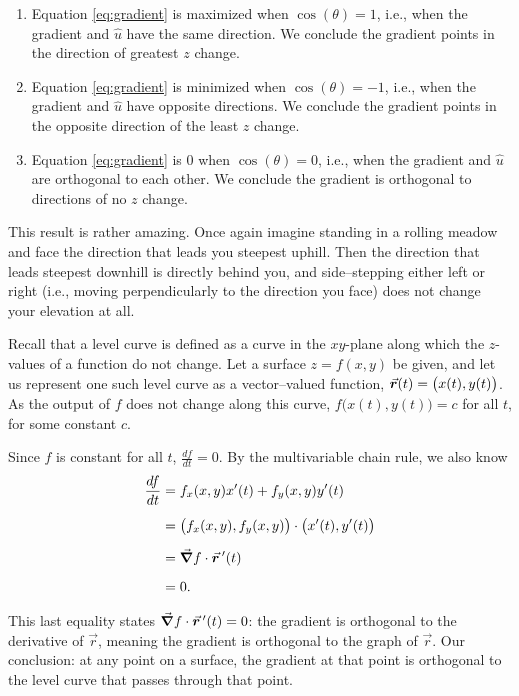 \begin{enumerate}
	\item Equation \eqref{eq:gradient} is maximized when $\cos(\theta) =1$, i.e., when the gradient and $\hat u$ have the same direction. We conclude the gradient points in the direction of greatest $z$ change.
	\item	Equation \eqref{eq:gradient} is minimized when $\cos(\theta) = -1$, i.e., when the gradient and $\hat u$ have opposite directions. We conclude the gradient points in the opposite direction of the least $z$ change.
	\item Equation \eqref{eq:gradient} is 0 when $\cos(\theta) = 0$, i.e., when the gradient and $\hat u$ are orthogonal to each other. We conclude the gradient is orthogonal to directions of no $z$ change. 
\end{enumerate}

This result is rather amazing. Once again imagine standing in a rolling meadow and face the  direction that leads you steepest uphill. Then the direction that leads steepest downhill is directly behind you, and side--stepping either left or right (i.e., moving perpendicularly to the direction you face) does not change your elevation at all.


Recall that a level curve is defined as a curve in the $xy$-plane along which the $z$-values of a function do not change. Let a surface $z=f(x,y)$ be given, and let us represent one such level curve as a vector--valued function, $\vrt = \left( x(t), y(t)\right)$. As the output of $f$ does not change along this curve, $f\big(x(t),y(t)\big) = c$ for all $t$, for some constant $c$.

Since $f$ is constant for all $t$, $\frac{df}{dt} = 0$. By the multivariable chain rule, we also know
\begin{align*}
\frac{df}{dt} &= f_x(x,y)x'(t) + f_y(x,y)y'(t)\\[0.2cm]						
						&= \left( f_x(x,y),f_y(x,y)\right) \cdot \left( x'(t),y'(t)\right)\\[0.2cm]
						&= \vec{\nabla} f \cdot \vrp(t)\\[0.2cm]
						&=0.
\end{align*}

This last equality states $\vec{\nabla} f \cdot \vrp(t) = 0$: the gradient is orthogonal to the derivative of $\vec r$, meaning the gradient is orthogonal to the graph of $\vec r$. Our conclusion: at any point on a surface, the gradient at that point is orthogonal to the level curve that passes through that point.

